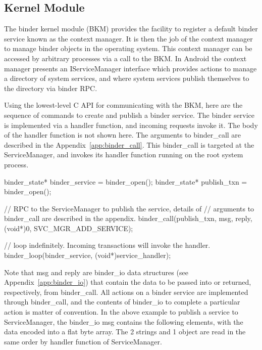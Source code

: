\documentclass[prodmode]{acmlarge}
\begin{document}
\subsection{Kernel Module}
The binder kernel module (BKM) provides the facility to register a default binder service known as the context manager. It is then the job of the context manager to manage binder objects in the operating system. This context manager can be accessed by arbitrary processes via a call to the BKM. In Android the context manager presents an IServiceManager interface which provides actions to manage a directory of system services, and where system services publish themselves to the directory via binder RPC.

Using the lowest-level C API for communicating with the BKM, here are the sequence of commands to create and publish a binder service. The binder service is implemented via a handler function, and incoming requests invoke it. The body of the handler function is not shown here. The arguments to binder\_call are described in the Appendix~\ref{app:binder_call}. This binder\_call is targeted at the ServiceManager, and invokes its handler function running on the root system process.

\begin{snippet}[label=snip:binder_call,caption=binder\_call to publish a service with ServiceManager]
binder_state* binder_service = binder_open();
binder_state* publish_txn = binder_open();

// RPC to the ServiceManager to publish the  service, details of
// arguments to binder_call  are described in the appendix.
binder_call(publish_txn, msg, reply, (void*)0, SVC_MGR_ADD_SERVICE);

// loop indefinitely. Incoming transactions  will invoke the handler.
binder_loop(binder_service, (void*)service_handler);
\end{snippet}

Note that msg and reply are binder\_io data structures (see Appendix~\ref{app:binder_io}) that contain the data to be passed into or returned, respectively, from binder\_call. All actions on a binder service are implemented through binder\_call, and the contents of binder\_io to complete a particular action is matter of convention. In the above example to publish a service to ServiceManager, the binder\_io msg contains the following elements, with the data encoded into a flat byte array. The 2 strings and 1 object are read in the same order by handler function of ServiceManager.
\end{document}

